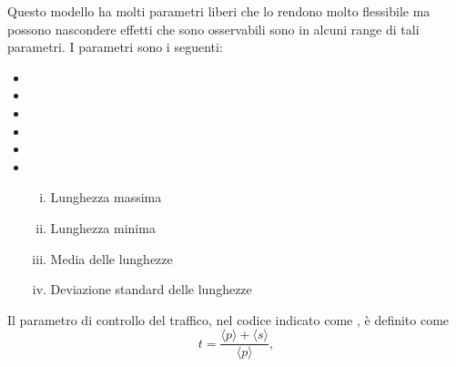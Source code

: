 \documentclass[main.tex]{subfiles}
\begin{document}
Questo modello ha molti parametri liberi che lo rendono molto flessibile ma possono nascondere effetti che sono osservabili sono in alcuni range di 
tali parametri. 
I parametri sono i seguenti:
\begin{itemize}
    \item {}
    \item {}
    \item {}
    \item {}
    \item {}
    \item {}
        \begin{enumerate}[(i)]
            \item Lunghezza massima
            \item Lunghezza minima
            \item Media delle lunghezze
            \item Deviazione standard delle lunghezze
        \end{enumerate}
\end{itemize}

Il parametro di controllo del traffico, nel codice indicato come , è definito come
\[ t =  \frac{\langle p \rangle + \langle s \rangle}{\langle p \rangle}, \]
\end{document}
